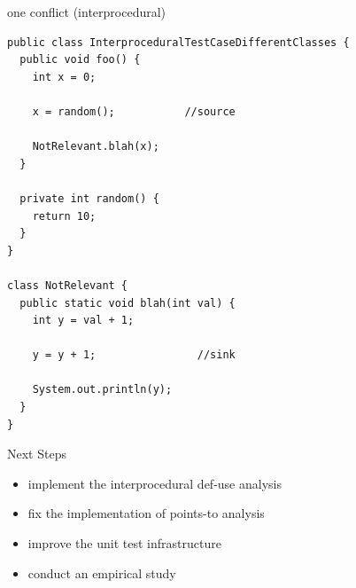 \documentclass{beamer}
\begin{document}
\begin{frame}[fragile]
\begin{block}{one conflict (interprocedural)}
\begin{lstlisting}
public class InterproceduralTestCaseDifferentClasses {
  public void foo() {
    int x = 0;

    x = random();           //source

    NotRelevant.blah(x);
  }

  private int random() {
    return 10;
  }
}

class NotRelevant {
  public static void blah(int val) {
    int y = val + 1;
    
    y = y + 1;                //sink
                
    System.out.println(y);
  }
}
\end{lstlisting}
\end{block}
\end{frame}

\begin{frame}
\huge{Next Steps} 
\end{frame}

\begin{frame}
  \begin{itemize}
   \item implement the interprocedural def-use analysis 
   \item fix the implementation of {\color{blue}} points-to analysis
   \item improve the unit test infrastructure
   \item conduct an empirical study
  \end{itemize}
\end{frame}

\begin{frame}
\titlepage
\end{frame}
\end{document}
